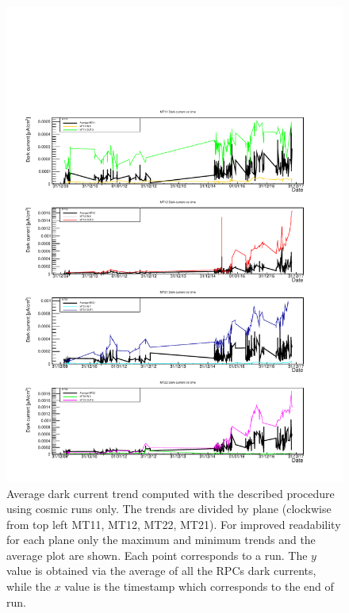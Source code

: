 \begin{figure}[!t]
\begin{center}
\includegraphics[width=0.95\linewidth]{Chapters/Performance/Figs/iDark_COSMIC_minmax.pdf}
\caption{Average dark current trend computed with the described procedure using cosmic runs only. The trends are divided by plane (clockwise from top left MT11, MT12, MT22, MT21). For improved readability for each plane only the maximum and minimum trends and the average plot are shown. Each point corresponds to a run. The $y$ value is obtained via the average of all the RPCs dark currents, while the $x$ value is the timestamp which corresponds to the end of run.}
\label{fig:iDarkCOSMIC}
\end{center}
\end{figure}

